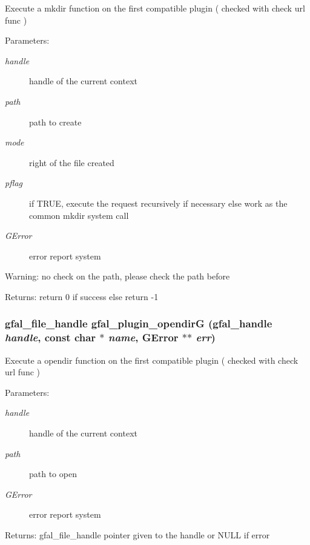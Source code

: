 Execute a mkdir function on the first compatible plugin ( checked with check url func ) \begin{Desc}
\item[Parameters:]
\begin{description}
\item[{\em handle}]handle of the current context \item[{\em path}]path to create \item[{\em mode}]right of the file created \item[{\em pflag}]if TRUE, execute the request recursively if necessary else work as the common mkdir system call \item[{\em GError}]error report system \end{description}
\end{Desc}
\begin{Desc}
\item[Warning:]no check on the path, please check the path before \end{Desc}
\begin{Desc}
\item[Returns:]return 0 if success else return -1 \end{Desc}
\subsubsection{\setlength{\rightskip}{0pt plus 5cm}gfal\_\-file\_\-handle gfal\_\-plugin\_\-opendir\-G (gfal\_\-handle {\em handle}, const char $\ast$ {\em name}, GError $\ast$$\ast$ {\em err})}\label{gfal__common__plugin_8h_0f8363d00d0f3418edaef414a84df034}


Execute a opendir function on the first compatible plugin ( checked with check url func ) \begin{Desc}
\item[Parameters:]
\begin{description}
\item[{\em handle}]handle of the current context \item[{\em path}]path to open \item[{\em GError}]error report system \end{description}
\end{Desc}
\begin{Desc}
\item[Returns:]gfal\_\-file\_\-handle pointer given to the handle or NULL if error \end{Desc}
